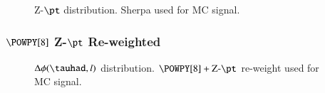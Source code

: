 \begin{figure}[h!tbp]
	\centering
	\hfill
	\caption{Z-$\pt$ distribution. Sherpa used for MC signal.}
	\label{AFig13S}
\end{figure}

\subsubsection{$\POWPY[8]$ Z-$\pt$ Re-weighted}

\begin{figure}[h!tbp]
	\centering
	\hfill
	\caption{$\Delta\phi (\tauhad,l)$ distribution. $\POWPY[8]+\text{Z-}\pt$ re-weight used for MC signal.}
	\label{AFig1P}
\end{figure} 

